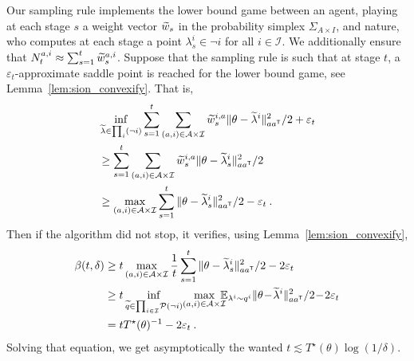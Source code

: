 Our sampling rule implements the lower bound game between an agent, playing at each stage $s$ a weight vector $\widetilde{w}_s$ in the probability simplex $\Sigma_{A\times I}$, and nature, who computes at each stage a point $\lambda_s^i \in \neg i$ for all $i\in \mathcal I$. We additionally ensure that $N_t^{a,i} \approx \sum_{s=1}^t \widetilde{w}_s^{a,i}$. Suppose that the sampling rule is such that at stage $t$, a $\varepsilon_t$-approximate saddle point is reached for the lower bound game, see Lemma~\ref{lem:sion_convexify}. That is,
\begin{align*}
&\inf_{\widetilde{\lambda} \in \prod_{i}(\neg i)} \sum_{s=1}^t \sum_{(a,i)\in \mathcal{A}\times\mathcal{I}} \widetilde{w}_s^{i,a} \Vert \theta - \widetilde{\lambda}^i \Vert^2_{a a^{\mathsf{\scriptscriptstyle T}}}/2 +\varepsilon_t
\\
&\ge \sum_{s=1}^t \sum_{(a,i)\in \mathcal{A}\times\mathcal{I}} \widetilde{w}_s^{i,a} \Vert \theta - \widetilde{\lambda}_s^i \Vert^2_{a a^{\mathsf{\scriptscriptstyle T}}}/2
\\
&\ge\max_{(a,i)\in \mathcal{A}\times\mathcal{I}} \sum_{s=1}^t \Vert \theta - \widetilde{\lambda}_s^i \Vert^2_{a a^{\mathsf{\scriptscriptstyle T}}}/2 - \varepsilon_t \: .
\end{align*}
Then if the algorithm did not stop, it verifies, using Lemma~\ref{lem:sion_convexify},
\begin{align*}
\beta(t,\delta)
&\ge t \max_{(a,i)\in \cA\times\cI} \frac{1}{t}\sum_{s=1}^t \Vert \theta - \tlambda_s^i \Vert^2_{a a^\top}/2 - 2\varepsilon_t
\\
&\ge t \inf_{\tq \in \mathcal \prod_{i\in \mathcal I}\cP(\neg i)} \! \max_{(a,i)\in \cA\times\cI} \!\!\!\! \mathbb{E}_{\lambda^i\sim q^i}\Vert \theta \! - \! \tlambda^i \Vert^2_{a a^\top}/2 \! - \! 2\varepsilon_t\\
&= t T^\star(\theta)^{-1} - 2 \varepsilon_t \: .
\end{align*}
Solving that equation, we get asymptotically the wanted $t\lesssim T^\star(\theta) \log(1/\delta)$.

